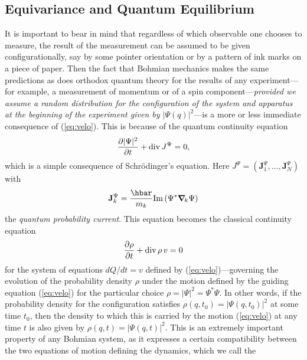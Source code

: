 \documentclass[12pt]{article}
\newcommand{\se}{Schr\"odinger's equation}
\newcommand{\BM}{Bohmian mechanics}
\newcommand{\mybold}[1]{\mbox{\boldmath $#1$}}
\newcommand{\rvect}[2]{(#1_1,\ldots,#1_#2)}
\newcommand{\pder}[2]{\frac{\partial #1}{\partial #2}}
\renewcommand{\Im}{\mbox{\textup{\textrm{Im}}}\,}
\renewcommand{\div}{\mbox{\textup{\textrm{div}}}\,}
\begin{document}
\subsection{Equivariance and Quantum Equilibrium}\label{sec.e}

It is important to bear in mind that regardless of which observable
one chooses to measure, the result of the measurement can be assumed
to be given configurationally, say by some pointer orientation or by a
pattern of ink marks on a piece of paper.  Then the fact that \BM{}
makes the same predictions as does orthodox quantum theory for the
results of any experiment---for example, a measurement of momentum or
of a spin component---\emph{provided we assume a random distribution
   for the configuration of the system and apparatus at the beginning
   of the experiment given by $|\Psi(q)|^2$}---is a more or less
immediate consequence of (\ref{eq:velo}).  This is because of the
quantum continuity equation
%
\begin{displaymath}
\pder{|\Psi|^2}{t} + \div J^{\Psi} =0,
\end{displaymath}
%
which is a simple consequence of \se{}.  Here $ J^{\Psi}=
\rvect{\mathbf{J}^\Psi}{N} $ with
%
\begin{displaymath}
\mathbf{J}^\Psi_k= \frac{\hbar}{m_k} \Im
(\Psi^*\mybold{\nabla}_{\!k}\Psi)
\end{displaymath}
%
the \emph{quantum probability current}.  This equation becomes the
classical continuity equation
\begin{equation}
\pder{\rho}{t} + \div \rho\, v =0
\label{eq:contieq}
\end{equation}
for the system of equations $dQ/dt=v$ defined by
(\ref{eq:velo})---governing the evolution of the probability density
$\rho$ under the motion defined by the guiding equation
(\ref{eq:velo}) for the particular choice $\rho=|\Psi|^2=\Psi^*\Psi$.
In other words, if the probability density for the configuration
satisfies $\rho(q,t_0)=|\Psi(q,t_0)|^2$ at some time $t_0$, then the
density to which this is carried by the motion (\ref{eq:velo}) at any
time $t$ is also given by $\rho(q,t)=|\Psi(q,t)|^2$.  This is an
extremely important property of any Bohmian system, as it expresses a
certain compatibility between the two equations of motion defining the
dynamics, which we call the
\end{document}
